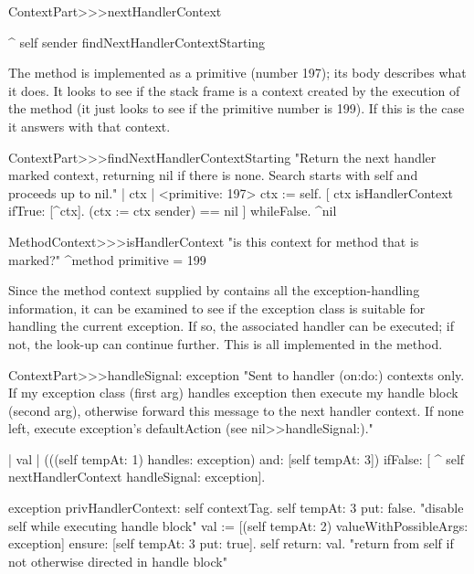 \documentclass[a4paper,10pt,twoside]{book}
\begin{document}
\begin{code}{}
ContextPart>>>nextHandlerContext

	^ self sender findNextHandlerContextStarting
\end{code}

The method  is implemented as a primitive (number 197); its body describes what it does. It looks to see
if the stack frame is a context created by the execution of the method  (it just looks to see if the primitive number is 199). If this is the case it answers with that context. 

\begin{code}{}
ContextPart>>>findNextHandlerContextStarting 
	"Return the next handler marked context, returning nil if there 
	is none. Search starts with self and proceeds up to nil." 
	| ctx |	
	<primitive: 197> 
	ctx := self. 
	[  ctx isHandlerContext ifTrue: [^ctx]. 
	   (ctx := ctx sender) == nil ] whileFalse. 
	^nil 
\end{code}

\begin{code}{}
MethodContext>>>isHandlerContext 
	"is this context for method that is marked?" 
	^method primitive = 199 
\end{code}

Since the method context supplied by  contains all the exception-handling information, it can be examined to see if the exception class is suitable for handling the current exception.
If so, the associated handler can be executed; if not, the look-up can continue further. 
This is all implemented in the  method.

\begin{code}{}
ContextPart>>>handleSignal: exception
	"Sent to handler (on:do:) contexts only.  If my exception class (first arg) handles exception then execute my handle block (second arg), otherwise forward this message to the next handler context.  If none left, execute exception's defaultAction (see nil>>handleSignal:)."

	| val |
	(((self tempAt: 1) handles: exception) and: [self tempAt: 3]) ifFalse: [
		^ self nextHandlerContext handleSignal: exception].

	exception privHandlerContext: self contextTag.
	self tempAt: 3 put: false.  "disable self while executing handle block"
	val := [(self tempAt: 2) valueWithPossibleArgs: {exception}]
		ensure: [self tempAt: 3 put: true].
	self return: val.  "return from self if not otherwise directed in handle block"
\end{code}
\end{document}
